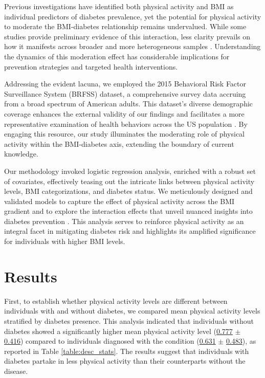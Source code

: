 \documentclass[11pt]{article}
\begin{document}
Previous investigations have identified both physical activity and BMI as individual predictors of diabetes prevalence, yet the potential for physical activity to moderate the BMI-diabetes relationship remains undervalued. While some studies provide preliminary evidence of this interaction, less clarity prevails on how it manifests across broader and more heterogeneous samples \cite{Zhao2020PhysicalAL, Mora2007PhysicalAA, Churilla2008PhysicalAP}. Understanding the dynamics of this moderation effect has considerable implications for prevention strategies and targeted health interventions.

Addressing the evident lacuna, we employed the 2015 Behavioral Risk Factor Surveillance System (BRFSS) dataset, a comprehensive survey data accruing from a broad spectrum of American adults. This dataset's diverse demographic coverage enhances the external validity of our findings and facilitates a more representative examination of health behaviors across the US population \cite{Rolle-Lake2020BehavioralRF, Pierannunzi2013ASR, Nelson2001ReliabilityAV}. By engaging this resource, our study illuminates the moderating role of physical activity within the BMI-diabetes axis, extending the boundary of current knowledge.

Our methodology invoked logistic regression analysis, enriched with a robust set of covariates, effectively teasing out the intricate links between physical activity levels, BMI categorizations, and diabetes status. We meticulously designed and validated models to capture the effect of physical activity across the BMI gradient and to explore the interaction effects that unveil nuanced insights into diabetes prevention \cite{Simmons2016EffectOP, Boruvka2016AssessingTC, Paradies2015RacismAA}. This analysis serves to reinforce physical activity as an integral facet in mitigating diabetes risk and highlights its amplified significance for individuals with higher BMI levels.

\section*{Results}

First, to establish whether physical activity levels are different between individuals with and without diabetes, we compared mean physical activity levels stratified by diabetes presence. This analysis indicated that individuals without diabetes showed a significantly higher mean physical activity level (\hyperlink{A0a}{0.777} $\pm$ \hyperlink{A0b}{0.416}) compared to individuals diagnosed with the condition (\hyperlink{A1a}{0.631} $\pm$ \hyperlink{A1b}{0.483}), as reported in Table {}\ref{table:desc_stats}. The results suggest that individuals with diabetes partake in less physical activity than their counterparts without the disease.
\end{document}
